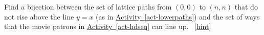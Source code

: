 \documentclass{book}
\begin{document}
\setcounter{project}{178}
\addtocounter{project}{-1}
\begin{activity}[]\label{act-pathshdseq}
\hypertarget{p-1061}{}%
Find a bijection between the set of lattice paths from \((0,0)\) to \((n,n)\) that do not rise above the line \(y = x\) (as in \hyperref[act-lowerpaths]{Activity~\ref{act-lowerpaths}}) and the set of ways that the movie patrons in \hyperref[act-hdseq]{Activity~\ref{act-hdseq}} can line up.%
~\hfill{\tiny\hyperlink{a-178}{[hint]}\hypertarget{q-178}{}}\end{activity}
\end{document}
